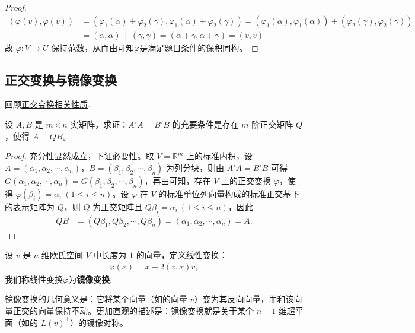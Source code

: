 \documentclass[../../main.tex]{subfiles}%
\begin{document}
\begin{proof}
\begin{align*}
(\varphi(v),\varphi(v)) &= (\varphi_1(\alpha) + \varphi_2(\gamma),\varphi_1(\alpha) + \varphi_2(\gamma)) = (\varphi_1(\alpha),\varphi_1(\alpha)) + (\varphi_2(\gamma),\varphi_2(\gamma))\\
&= (\alpha,\alpha) + (\gamma,\gamma) = (\alpha + \gamma,\alpha + \gamma) = (v,v)
\end{align*}
故 \(\varphi:V \to U\) 保持范数，从而由可知$\varphi$是满足题目条件的保积同构。

\end{proof}


\subsection{正交变换与镜像变换}

回顾\hyperref[theorem:正交变换和酉变换的基本性质]{正交变换相关性质}.

\begin{proposition}\label{proposition:例9.39}
设 \(A,B\) 是 \(m\times n\) 实矩阵，求证：\(A'A = B'B\) 的充要条件是存在 \(m\) 阶正交矩阵 \(Q\)，使得 \(A = QB\)。
\end{proposition}
\begin{proof}

充分性显然成立，下证必要性。取 \(V = \mathbb{R}^m\) 上的标准内积，设 \(A = (\alpha_1,\alpha_2,\cdots,\alpha_n)\)，\(B = (\beta_1,\beta_2,\cdots,\beta_n)\) 为列分块，则由 \(A'A = B'B\) 可得 \(G(\alpha_1,\alpha_2,\cdots,\alpha_n) = G(\beta_1,\beta_2,\cdots,\beta_n)\)，再由可知，存在 \(V\) 上的正交变换 \(\varphi\)，使得 \(\varphi(\beta_i) = \alpha_i\ (1\leqslant  i \leqslant  n)\)。设 \(\varphi\) 在 \(V\) 的标准单位列向量构成的标准正交基下的表示矩阵为 \(Q\)，则 \(Q\) 为正交矩阵且 \(Q\beta_i = \alpha_i\ (1\leqslant  i \leqslant  n)\)，因此
\begin{align*}
QB &= (Q\beta_1,Q\beta_2,\cdots,Q\beta_n) = (\alpha_1,\alpha_2,\cdots,\alpha_n) = A.
\end{align*}

\end{proof}

\begin{definition}[镜像变换]
设 \(v\) 是 \(n\) 维欧氏空间 \(V\) 中长度为 \(1\) 的向量，定义线性变换：
\begin{align*}
\varphi(x) = x - 2(v,x)v,
\end{align*}
我们称线性变换$\varphi$为\textbf{镜像变换}.
\end{definition}
\begin{remark}
镜像变换的几何意义是：它将某个向量（如的向量 \(v\)）变为其反向向量，而和该向量正交的向量保持不动。更加直观的描述是：镜像变换就是关于某个 \(n - 1\) 维超平面（如的 \(L(v)^{\perp}\)）的镜像对称。
\end{remark}
\end{document}
